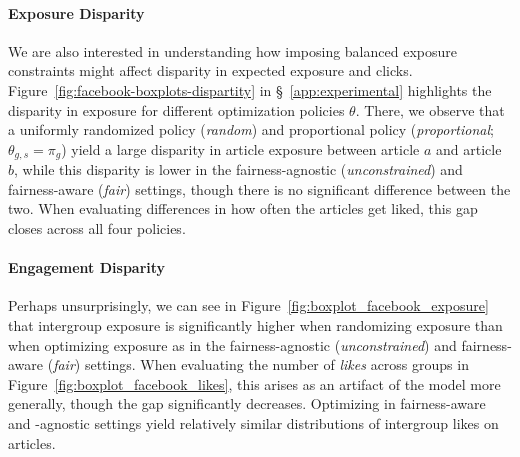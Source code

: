 \documentclass[letterpaper]{article} %
\begin{document}
\paragraph{Exposure Disparity}
We are also interested in understanding how imposing balanced exposure constraints  might affect disparity in expected exposure and clicks.
%
Figure~\ref{fig:facebook-boxplots-dispartity} in \S~\ref{app:experimental} highlights the disparity in exposure for different optimization policies $\theta$.
%
%
There, we observe that a uniformly randomized policy (\textit{random}) and proportional policy (\textit{proportional}; $\theta_{g,s} = \pi_{g}$) yield a large disparity in article exposure between article $a$ and article $b$, while this disparity is lower in the fairness-agnostic (\textit{unconstrained}) and fairness-aware (\textit{fair}) settings, though there is no significant difference between the two.
%
When evaluating differences in how often the articles get liked, this gap closes across all four policies.
%



\paragraph{Engagement Disparity}
Perhaps unsurprisingly, we can see in Figure~\ref{fig:boxplot_facebook_exposure} that intergroup exposure is significantly higher when randomizing exposure than when optimizing exposure as in the fairness-agnostic (\textit{unconstrained}) and fairness-aware (\textit{fair}) settings.
%
When evaluating the number of \emph{likes} across groups in Figure~\ref{fig:boxplot_facebook_likes}, this arises as an artifact of the model more generally, though the gap significantly decreases.
%
Optimizing in fairness-aware and -agnostic settings yield relatively similar distributions of intergroup likes on articles.
\end{document}
